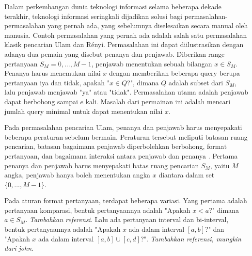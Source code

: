\documentclass[conference,compsoc]{IEEEtran}
\begin{document}
Dalam perkembangan dunia teknologi informasi selama beberapa dekade terakhir, teknologi informasi seringkali dijadikan solusi bagi permasalahan-permasalahan yang pernah ada, yang sebelumnya diselesaikan secara manual oleh manusia. Contoh permasalahan yang pernah ada adalah salah satu permasalahan klasik pencarian Ulam dan Rényi. Permasalahan ini dapat diilustrasikan dengan adanya dua pemain yang disebut penanya dan penjawab. Diberikan range pertanyaan $S_M = {0,...,M-1}$, penjawab menentukan sebuah bilangan $x \in S_M$. Penanya harus menemukan nilai $x$ dengan memberikan beberapa query berupa pertanyaan iya dan tidak, apakah "$x \in Q$?", dimana $Q$ adalah subset dari $S_M$, lalu penjawab menjawab "ya" atau "tidak". Permasalahan utama adalah penjawab dapat berbohong sampai $e$ kali. Masalah dari permainan ini adalah mencari jumlah query minimal untuk dapat menentukan nilai $x$.


Pada permasalahan pencarian Ulam, penanya dan penjawab harus menyepakati beberapa peraturan sebelum bermain. Peraturan tersebut meliputi batasan ruang pencarian, batasan bagaimana penjawab diperbolehkan berbohong, format pertanyaan, dan bagaimana interaksi antara penjawab dan penanya \cite{Pelc2002}. Pertama penanya dan penjawab harus menyepakati batas ruang pencarian $S_M$, yaitu $M$ angka, penjawab hanya boleh menentukan angka $x$ diantara dalam set $\{0,...,M-1\}$.

Pada aturan format pertanyaan, terdapat beberapa variasi. Yang pertama adalah pertanyaan komparasi, bentuk pertanyaannya adalah "Apakah $x<a$?" dimana $a \in S_M$. \textit{Tambahkan referensi}. Lalu ada pertanyaan interval dan bi-interval, bentuk pertanyaannya adalah "Apakah $x$ ada dalam interval $[a,b]$?" dan "Apakah $x$ ada dalam interval $[a,b] \cup [c,d]$?". \textit{Tambahkan referensi, mungkin dari john}.

\end{document}
